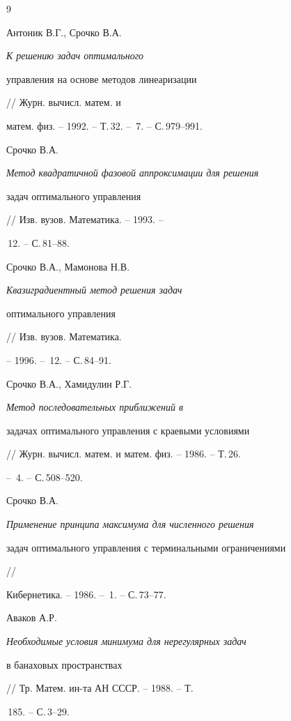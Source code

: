 \begin{thebibliography}{9} 


 




Антоник В.Г., Срочко В.А. {\em К решению задач оптимального 


управления на основе методов линеаризации} // Журн. вычисл. матем. и 


матем. физ. -- 1992. -- Т.\,32. -- \No\,7. -- С.\,979--991. 




Срочко В.А. {\em Метод квадратичной фазовой аппроксимации для решения 


задач оптимального управления} // Изв. вузов. Математика. -- 1993. -- 


\No\,12. -- С.\,81--88. 




Срочко В.А., Мамонова Н.В. {\em Квазиградиентный метод решения задач 


оптимального управления} // Изв. вузов. Математика. 


-- 1996. -- \No\,12. -- С.\,84--91. 




Срочко В.А., Хамидулин Р.Г. {\em Метод последовательных приближений в 


задачах оптимального управления с краевыми условиями} 


// Журн. вычисл. матем. и матем. физ. -- 1986. -- Т.\,26. 


-- \No\,4. -- С.\,508--520. 




Срочко В.А. {\em Применение принципа максимума для численного решения 


задач оптимального управления с терминальными ограничениями} // 


Кибернетика. -- 1986. -- \No\,1. -- С.\,73--77. 




Аваков А.Р. {\em Необходимые условия минимума для нерегулярных задач 


в банаховых пространствах} // Тр. Матем. ин-та АН СССР. -- 1988. -- Т. 


\,185. -- С.\,3--29. 


 


\end{thebibliography} 


 


\vskip 2cm 


 






 


\label{end} 


 


